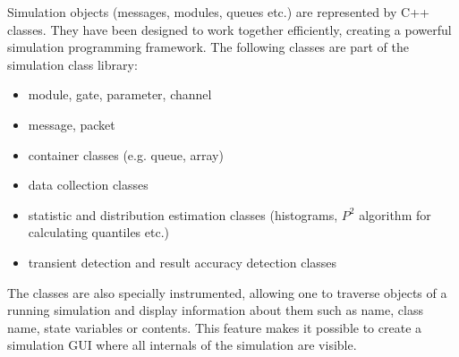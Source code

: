 Simulation objects (messages, modules, queues etc.) are represented
by C++ classes. They have been designed to work together efficiently,
creating a powerful simulation programming framework.
The following classes are part of the simulation class library:

\begin{itemize}
  \item{module, gate, parameter, channel}
  \item{message, packet}
  \item{container classes (e.g. queue, array)}
  \item{data collection classes}
  \item{statistic and distribution estimation classes (histograms, $P^2$
  algorithm for calculating quantiles etc.)}
  \item{transient detection and result accuracy detection classes}
\end{itemize}

The classes are also specially instrumented, allowing one
to traverse objects of a running simulation and display information
about them such as name, class name, state variables or contents.
This feature makes it possible to create a simulation GUI where
all internals of the simulation are visible.



